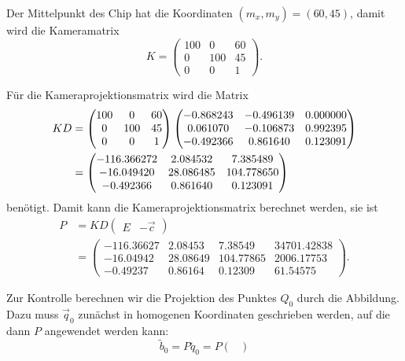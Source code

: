 \begin{loesung}
\begin{teilaufgaben}
\item Der Mittelpunkt des Chip hat die Koordinaten $(m_x,m_y)=(60,45)$,
damit wird die Kameramatrix
\[
K
=
\begin{pmatrix}
100&  0&60\\
  0&100&45\\
  0&  0& 1
\end{pmatrix}.
\]
\item Für die Kameraprojektionsmatrix wird die Matrix
\begin{align}
KD
&=
\begin{pmatrix}
100&  0&60\\
  0&100&45\\
  0&  0& 1
\end{pmatrix}
\begin{pmatrix}
  -0.868243& -0.496139&  0.000000\\
   0.061070& -0.106873&  0.992395\\
  -0.492366&  0.861640&  0.123091
\end{pmatrix}
\notag
\\
&=
\begin{pmatrix}
  -116.366272&     2.084532&     7.385489\\
   -16.049420&    28.086485&   104.778650\\
    -0.492366&     0.861640&     0.123091
\end{pmatrix}
\label{60000001:kd}
\end{align}
benötigt.
Damit kann die Kameraprojektionsmatrix berechnet werden, sie ist
\begin{align*}
P
&=
KD\begin{pmatrix}E&-\vec c\end{pmatrix}
\\
&=
\begin{pmatrix}
  -116.36627&  2.08453&   7.38549& 34701.42838\\
   -16.04942& 28.08649& 104.77865&  2006.17753\\
    -0.49237&  0.86164&   0.12309&    61.54575
\end{pmatrix}.
\end{align*}
\item
Zur Kontrolle berechnen wir die Projektion des Punktes $Q_0$ durch die
Abbildung. 
Dazu muss $\vec q_0$ zunächst in homogenen Koordinaten geschrieben werden,
auf die dann $P$ angewendet werden kann:
\[
\tilde b_0 = 
P\tilde q_0
=
P
\begin{pmatrix}

\end{pmatrix}\]
\end{teilaufgaben}
\end{loesung}
